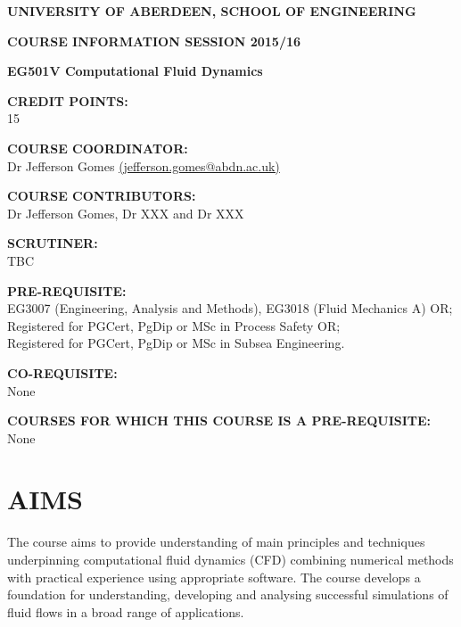\documentclass[12pts,a4paper,amsmath,amssymb,floatfix]{article}%
\begin{document}
\begin{center}
{\large {\bf UNIVERSITY OF ABERDEEN, SCHOOL OF ENGINEERING}}
\medskip

{\large {\bf COURSE INFORMATION SESSION 2015/16}}
\bigskip 

{\Large {\bf EG501V Computational Fluid Dynamics}}
\end{center}

\bigskip
\begin{flushleft}

{\large {\bf CREDIT POINTS:}}\\
\hspace{0.8cm} 15
\medskip

{\large {\bf COURSE COORDINATOR: }}\\
\hspace{0.8cm} Dr Jefferson Gomes \href{mailto:jefferson.gomes@abdn.ac.uk}{(jefferson.gomes@abdn.ac.uk)}
\medskip 

{\large {\bf COURSE CONTRIBUTORS:}}\\
\hspace{0.8cm} Dr Jefferson Gomes, Dr XXX and Dr XXX
\medskip

{\large {\bf SCRUTINER:}}\\
\hspace{0.8cm} TBC
\medskip  

{\large {\bf PRE-REQUISITE:}}\\
\hspace{0.8cm}EG3007 (Engineering, Analysis and Methods), EG3018 (Fluid Mechanics A) OR;\\
\hspace{0.8cm}Registered for PGCert, PgDip or MSc in Process Safety OR;\\
\hspace{0.8cm}Registered for PGCert, PgDip or MSc in Subsea Engineering.\\
\medskip

{\large {\bf CO-REQUISITE:}}\\
\hspace{0.8cm}None
\medskip 

{\large {\bf COURSES FOR WHICH THIS COURSE IS A PRE-REQUISITE:}}\\
\hspace{0.8cm}None
\end{flushleft}

\clearpage


\section{AIMS}
The course aims to provide understanding of main principles and techniques underpinning computational fluid dynamics (CFD) combining numerical methods with practical experience using appropriate software. The course develops a foundation for understanding, developing and analysing successful simulations of fluid flows in a broad range of applications.
\end{document}

